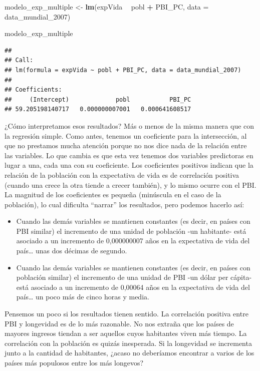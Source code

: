 \documentclass[spanish,]{book}
\newenvironment{Shaded}{\begin{snugshade}}{\end{snugshade}}
\newcommand{\DataTypeTok}[1]{\textcolor[rgb]{0.13,0.29,0.53}{#1}}
\newcommand{\DecValTok}[1]{\textcolor[rgb]{0.00,0.00,0.81}{#1}}
\newcommand{\KeywordTok}[1]{\textcolor[rgb]{0.13,0.29,0.53}{\textbf{#1}}}
\newcommand{\NormalTok}[1]{#1}
\newcommand{\OperatorTok}[1]{\textcolor[rgb]{0.81,0.36,0.00}{\textbf{#1}}}
\newcommand{\StringTok}[1]{\textcolor[rgb]{0.31,0.60,0.02}{#1}}
\providecommand{\tightlist}{%
  \setlength{\itemsep}{0pt}\setlength{\parskip}{0pt}}
\begin{document}
\begin{Shaded}
\begin{Highlighting}[]
\NormalTok{modelo_exp_multiple <-}\StringTok{ }\KeywordTok{lm}\NormalTok{(expVida }\OperatorTok{~}\StringTok{ }\NormalTok{pobl }\OperatorTok{+}\StringTok{ }\NormalTok{PBI_PC, }\DataTypeTok{data =}\NormalTok{ data_mundial_}\DecValTok{2007}\NormalTok{)}

\NormalTok{modelo_exp_multiple}
\end{Highlighting}
\end{Shaded}

\begin{verbatim}
## 
## Call:
## lm(formula = expVida ~ pobl + PBI_PC, data = data_mundial_2007)
## 
## Coefficients:
##     (Intercept)             pobl           PBI_PC  
## 59.205198140717   0.000000007001   0.000641608517
\end{verbatim}

¿Cómo interpretamos esos resultados? Más o menos de la misma manera que con la regresión simple. Como antes, tenemos un coeficiente para la intersección, al que no prestamos mucha atención porque no nos dice nada de la relación entre las variables. Lo que cambia es que esta vez tenemos dos variables predictoras en lugar a una, cada una con su coeficiente. Los coeficientes positivos indican que la relación de la población con la expectativa de vida es de correlación positiva (cuando una crece la otra tiende a crecer también), y lo mismo ocurre con el PBI. La magnitud de los coeficientes es pequeña (minúscula en el caso de la población), lo cual dificulta ``narrar'' los resultados, pero podemos hacerlo así:

\begin{itemize}
\tightlist
\item
  Cuando las demás variables se mantienen constantes (es decir, en países con PBI similar) el incremento de una unidad de población -un habitante- está asociado a un incremento de 0,000000007 años en la expectativa de vida del país\ldots{} unas dos décimas de segundo.
\item
  Cuando las demás variables se mantienen constantes (es decir, en países con población similar) el incremento de una unidad de PBI -un dólar per cápita- está asociado a un incremento de 0,00064 años en la expectativa de vida del país\ldots{} un poco más de cinco horas y media.
\end{itemize}

Pensemos un poco si los resultados tienen sentido. La correlación positiva entre PBI y longevidad es de lo más razonable. No nos extraña que los países de mayores ingresos tiendan a ser aquellos cuyos habitantes viven más tiempo. La correlación con la población es quizás inesperada. Si la longevidad se incrementa junto a la cantidad de habitantes, ¿acaso no deberíamos encontrar a varios de los países más populosos entre los más longevos?
\end{document}
